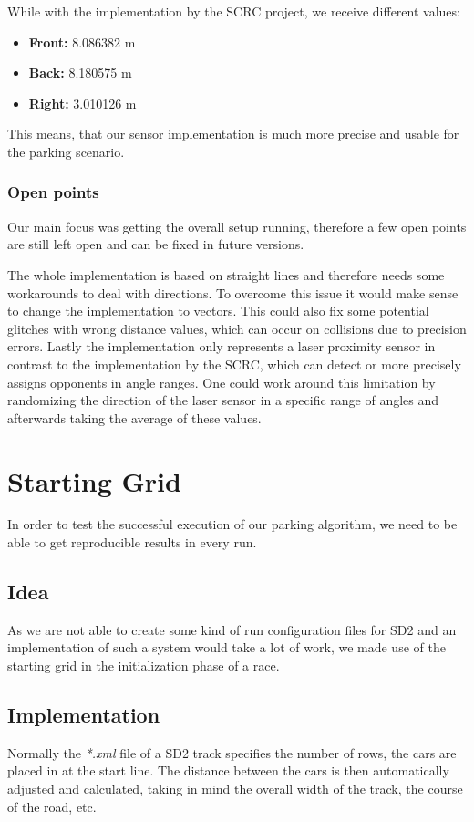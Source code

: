 \documentclass[paper=a4, fontsize=11pt]{scrreprt}
\begin{document}
While with the implementation by the SCRC project,
we receive different values:
\begin{itemize}
  \item \textbf{Front:} 8.086382 m
  \item \textbf{Back:} 8.180575 m
  \item \textbf{Right:} 3.010126 m
\end{itemize}

This means, that our sensor implementation is much more precise
and usable for the parking scenario.

\subsubsection{Open points}
Our main focus was getting the overall setup running,
therefore a few open points are still left open
and can be fixed in future versions.

The whole implementation is based on straight lines
and therefore needs some workarounds to deal with directions.
To overcome this issue it would make sense to change the implementation to vectors.
This could also fix some potential glitches with wrong distance values,
which can occur on collisions due to precision errors.
Lastly the implementation only represents a laser proximity sensor
in contrast to the implementation by the SCRC,
which can detect or more precisely assigns opponents in angle ranges.
One could work around this limitation by randomizing the direction of the laser sensor in a specific range of angles
and afterwards taking the average of these values.

\section{Starting Grid}
In order to test the successful execution of our parking algorithm,
we need to be able to get reproducible results in every run.

\subsection{Idea}
As we are not able to create some kind of run configuration files for SD2
and an implementation of such a system would take a lot of work,
we made use of the starting grid in the initialization phase of a race.

\subsection{Implementation}
Normally the \textit{*.xml} file of a SD2 track specifies the number of rows,
the cars are placed in at the start line.
The distance between the cars is then automatically adjusted and calculated,
taking in mind the overall width of the track, the course of the road, etc.
\end{document}
